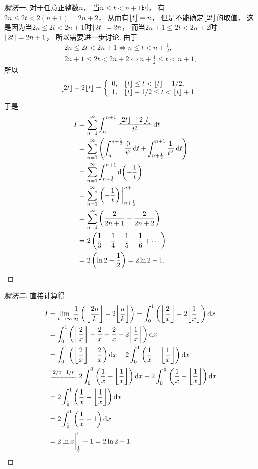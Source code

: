 \begin{example}
\begin{solution}
\begin{proof}[解法一]
对于任意正整数\(n\)，
当\(n \leq t < n+1\)时，
有\(2n \leq 2t < 2(n+1) = 2n+2\)，
从而有\(\lfloor t\rfloor = n\)，
但是不能确定\(\lfloor2t\rfloor\)的取值，
这是因为当\(2n \leq 2t < 2n+1\)时\(\lfloor2t\rfloor = 2n\)，
而当\(2n+1 \leq 2t < 2n+2\)时\(\lfloor2t\rfloor = 2n+1\)，
所以需要进一步讨论.
由于\begin{gather*}
	2n \leq 2t < 2n+1
	\iff
	n \leq t < n+\frac12, \\
	2n+1 \leq 2t < 2n+2
	\iff
	n+\frac12 \leq t < n+1,
\end{gather*}
所以\begin{equation*}
	\lfloor2t\rfloor - 2\lfloor t\rfloor
	= \left\{ \begin{array}{cl}
		0, & \lfloor t\rfloor \leq t < \lfloor t\rfloor+1/2, \\
		1, & \lfloor t\rfloor+1/2 \leq t < \lfloor t\rfloor+1.
	\end{array} \right.
\end{equation*}
于是\begin{align*}
	I &= \sum_{n=1}^\infty \int_n^{n+1} \frac{\floor{2t}-2\floor{t}}{t^2} \dd{t} \\
	&= \sum_{n=1}^\infty \left(
		\int_n^{n+\frac12} \frac{0}{t^2} \dd{t}
		+ \int_{n+\frac12}^{n+1} \frac{1}{t^2} \dd{t}
	\right) \\
	&= \sum_{n=1}^\infty \int_{n+\frac12}^{n+1} \dd(-\frac1t) \\
	&= \sum_{n=1}^\infty \eval{\left( -\frac1t \right)}_{n+\frac12}^{n+1} \\
	&= \sum_{n=1}^\infty \left( \frac2{2n+1} - \frac2{2n+2} \right) \\
	&= 2 \left( \frac13 - \frac14 + \frac15 - \frac16 + \dotsb \right) \\
	&= 2 \left( \ln2 - \frac12 \right)
	= 2\ln2 - 1.
\end{align*}
\end{proof}
\begin{proof}[解法二]
直接计算得\begin{align*}
	I &= \lim_{n\to\infty} \frac1n \left( \floor*{\frac{2n}{k}} - 2 \floor*{\frac{n}{k} \vphantom{\frac{2n}{k}}} \right)
	= \int_0^1 \left( \floor*{\frac2x} - 2 \floor*{\frac1x} \right) \dd{x} \\
	&= \int_0^1 \left( \floor*{\frac2x} - \frac2x + \frac2x - 2 \floor*{\frac1x} \right) \dd{x} \\
	&= \int_0^1 \left( \floor*{\frac2x} - \frac2x \right) \dd{x}
	+ 2 \int_0^1 \left( \frac1x - \floor*{\frac1x} \right) \dd{x} \\
	&\xlongequal{2/x=1/t}
	2 \int_0^1 \left( \frac1x - \floor*{\frac1x} \right) \dd{x}
	- 2 \int_0^{\frac12} \left( \frac1x - \floor*{\frac1x} \right) \dd{x} \\
	&= 2 \int_{\frac12}^1 \left( \frac1x - \floor*{\frac1x} \right) \dd{x} \\
	&= 2 \int_{\frac12}^1 \left( \frac1x - 1 \right) \dd{x} \\
	&= 2 \eval{\ln x}_{\frac12}^1 - 1
	= 2\ln2 - 1.
\end{align*}
\end{proof}
\end{solution}
\end{example}
